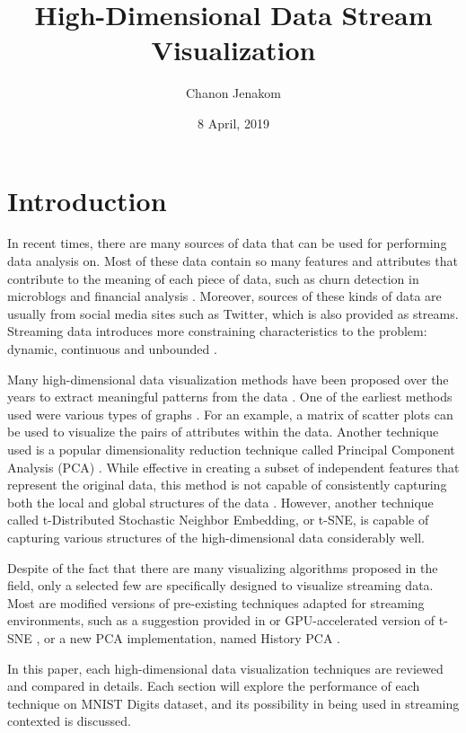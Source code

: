 \documentclass[twocolumn]{article}
\title{High-Dimensional Data Stream Visualization}
\author{Chanon Jenakom}
\date{8 April, 2019}
\begin{document}
\maketitle

\section{Introduction}

In recent times, there are many sources of data that can be used for performing data analysis on.
Most of these data contain so many features and attributes that contribute to the meaning of
each piece of data, such as churn detection in microblogs \cite{churn_microblog} and financial
analysis \cite{multidimensional_visualization_1}. Moreover, sources of these kinds of data are
usually from social media sites such as Twitter, which is also provided as streams. Streaming data
introduces more constraining characteristics to the problem: dynamic, continuous and unbounded
\cite{stream_mining_survey}.

Many high-dimensional data visualization methods have been proposed over the years to
extract meaningful patterns from the data \cite{multidimensional_visualization_1}. One of the
earliest methods used were various types of graphs \cite{multidimensional_visualization_2}. For an
example, a matrix of scatter plots can be used to visualize the pairs of attributes within the
data. Another technique used is a popular dimensionality reduction technique called Principal
Component Analysis (PCA) \cite{pca}. While effective in creating a subset of independent features
that represent the original data, this method is not capable of consistently capturing both the
local and global structures of the data \cite{tsne}. However, another technique called
t-Distributed Stochastic Neighbor Embedding, or t-SNE, is capable of capturing various structures
of the high-dimensional data considerably well.

Despite of the fact that there are many visualizing algorithms proposed in the field, only a
selected few are specifically designed to visualize streaming data. Most are modified versions of
pre-existing techniques adapted for streaming environments, such as a suggestion provided in
\cite{atsne} or GPU-accelerated version of t-SNE \cite{tsne_cuda}, or a new PCA implementation,
named History PCA \cite{hist_pca}.

In this paper, each high-dimensional data visualization techniques are reviewed and compared in
details. Each section will explore the performance of each technique on MNIST Digits dataset, and
its possibility in being used in streaming contexted is discussed.
\end{document}
